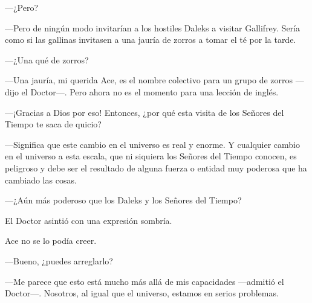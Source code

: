 ---¿Pero?

---Pero de ningún modo invitarían a los hostiles Daleks a
visitar Gallifrey. Sería como si las gallinas invitasen a una jauría de
zorros a tomar el té por la tarde.

---¿Una qué de zorros?

---Una jauría, mi querida Ace, es el nombre colectivo para un
grupo de zorros ---dijo el Doctor---. Pero ahora no es el momento para
una lección de inglés.

---¡Gracias a Dios por eso! Entonces, ¿por qué esta visita de
los Señores del Tiempo te saca de quicio?

---Significa que este cambio en el universo es real y enorme. Y
cualquier cambio en el universo a esta escala, que ni siquiera los
Señores del Tiempo conocen, es peligroso y debe ser el resultado de
alguna fuerza o entidad muy poderosa que ha cambiado las cosas.

---¿Aún más poderoso que los Daleks y los Señores del Tiempo?

El Doctor asintió con una expresión sombría.

Ace no se lo podía creer.

---Bueno, ¿puedes arreglarlo?

---Me parece que esto está mucho más allá de mis capacidades
---admitió el Doctor---. Nosotros, al igual que el universo, estamos en
serios problemas.